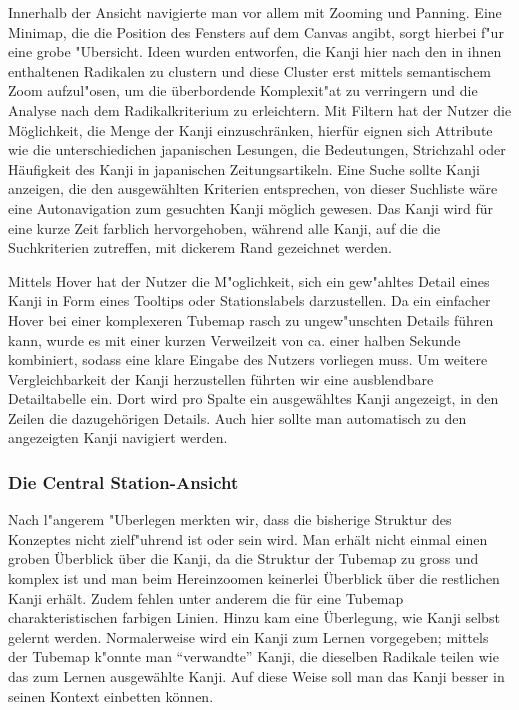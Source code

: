 Innerhalb der Ansicht navigierte man vor allem mit Zooming und Panning. Eine Minimap, die die Position des Fensters auf dem Canvas angibt, sorgt hierbei f"ur eine grobe "Ubersicht. Ideen wurden entworfen, die Kanji hier nach den in ihnen enthaltenen Radikalen zu clustern und diese Cluster erst mittels semantischem Zoom aufzul"osen, um die überbordende Komplexit"at zu verringern und die Analyse nach dem Radikalkriterium zu erleichtern. Mit Filtern hat der Nutzer die Möglichkeit, die Menge der Kanji einzuschränken, hierfür eignen sich Attribute wie die unterschiedichen japanischen Lesungen, die Bedeutungen, Strichzahl oder Häufigkeit des Kanji in japanischen Zeitungsartikeln. Eine Suche sollte Kanji anzeigen, die den ausgewählten Kriterien entsprechen, von dieser Suchliste wäre eine Autonavigation zum gesuchten Kanji möglich gewesen. Das Kanji wird für eine kurze Zeit farblich hervorgehoben, während alle Kanji, auf die die Suchkriterien zutreffen, mit dickerem Rand gezeichnet werden.

Mittels Hover hat der Nutzer die M"oglichkeit, sich ein gew"ahltes Detail eines Kanji in Form eines Tooltips oder Stationslabels darzustellen. Da ein einfacher Hover bei einer komplexeren Tubemap rasch zu ungew"unschten Details führen kann, wurde es mit einer kurzen Verweilzeit von ca. einer halben Sekunde kombiniert, sodass eine klare Eingabe des Nutzers vorliegen muss. Um weitere Vergleichbarkeit der Kanji herzustellen führten wir eine ausblendbare Detailtabelle ein. Dort wird pro Spalte ein ausgewähltes Kanji angezeigt, in den Zeilen die dazugehörigen Details. Auch hier sollte man automatisch zu den angezeigten Kanji navigiert werden. 


\subsubsection{Die Central Station-Ansicht}
Nach l"angerem "Uberlegen merkten wir, dass die bisherige Struktur des Konzeptes nicht zielf"uhrend ist oder sein wird. Man erhält nicht einmal einen groben Überblick über die Kanji, da die Struktur der Tubemap zu gross  und komplex ist und man beim Hereinzoomen keinerlei Überblick über die restlichen Kanji erhält. Zudem fehlen unter anderem die für eine Tubemap charakteristischen farbigen Linien. Hinzu kam eine Überlegung, wie Kanji selbst gelernt werden. Normalerweise wird ein Kanji zum Lernen vorgegeben; mittels der Tubemap k"onnte man "`verwandte"' Kanji, die dieselben Radikale teilen wie das zum Lernen ausgewählte Kanji. Auf diese Weise soll man das Kanji besser in seinen Kontext einbetten können.

